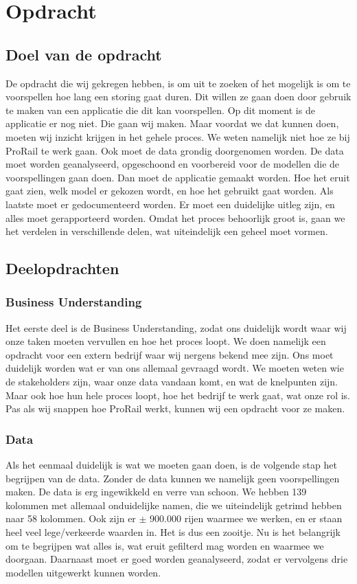 \documentclass{article}
\begin{document}
\newpage
\section{Opdracht}

\subsection{Doel van de opdracht}
De opdracht die wij gekregen hebben, is om uit te zoeken of het mogelijk is om te voorspellen hoe lang een storing gaat duren. Dit willen ze gaan doen door gebruik te maken van een applicatie die dit kan voorspellen. Op dit moment is de applicatie er nog niet. Die gaan wij maken. Maar voordat we dat kunnen doen, moeten wij inzicht krijgen in het gehele proces. We weten namelijk niet hoe ze bij ProRail te werk gaan. Ook moet de data grondig doorgenomen worden. De data moet worden geanalyseerd, opgeschoond en voorbereid voor de modellen die de voorspellingen gaan doen. Dan moet de applicatie gemaakt worden. Hoe het eruit gaat zien, welk model er gekozen wordt, en hoe het gebruikt gaat worden. Als laatste moet er gedocumenteerd worden. Er moet een duidelijke uitleg zijn, en alles moet gerapporteerd worden. Omdat het proces behoorlijk groot is, gaan we het verdelen in verschillende delen, wat uiteindelijk een geheel moet vormen.

\subsection{Deelopdrachten}

\subsubsection{Business Understanding}
Het eerste deel is de Business Understanding, zodat ons duidelijk wordt waar wij onze taken moeten vervullen en hoe het proces loopt. We doen namelijk een opdracht voor een extern bedrijf waar wij nergens bekend mee zijn. Ons moet duidelijk worden wat er van ons allemaal gevraagd wordt. We moeten weten wie de stakeholders zijn, waar onze data vandaan komt, en wat de knelpunten zijn. Maar ook hoe hun hele proces loopt, hoe het bedrijf te werk gaat, wat onze rol is. Pas als wij snappen hoe ProRail werkt, kunnen wij een opdracht voor ze maken.

\subsubsection{Data}
Als het eenmaal duidelijk is wat we moeten gaan doen, is de volgende stap het begrijpen van de data. Zonder de data kunnen we namelijk geen voorspellingen maken. De data is erg ingewikkeld en verre van schoon. We hebben 139 kolommen met allemaal onduidelijke namen, die we uiteindelijk getrimd hebben naar 58 kolommen. Ook zijn er $\pm$ 900.000 rijen waarmee we werken, en er staan heel veel lege/verkeerde waarden in. Het is dus een zooitje. Nu is het belangrijk om te begrijpen wat alles is, wat eruit gefilterd mag worden en waarmee we doorgaan. Daarnaast moet er goed worden geanalyseerd, zodat er vervolgens drie modellen uitgewerkt kunnen worden.
\end{document}
